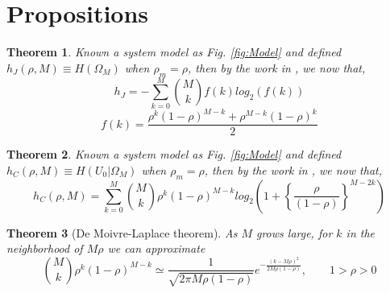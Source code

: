\documentclass[a4paper,10pt]{article}
\newtheorem{mytheorem}{Theorem}
\begin{document}
\section{Propositions}
\label{sec:Propositions}

\begin{mdframed}[style=MDFStyGrayScreen]
\begin{mytheorem}
 \label{prop:OmegaM}
 Known a system model as Fig. \ref{fig:Model} and defined $h_{J}(\rho,M)\equiv H(\Omega_M)$ 
 when $\rho_m=\rho$, then
 by the work in \cite[p.~37]{shomega}, we now that,
\begin{equation}\label{eq:OmegaMP1}
 h_{J} = -\sum_{k=0}^M \binom{M}{k}f(k)log_2( f(k) )
\end{equation}
\begin{equation}\label{eq:OmegaMP2}
f(k)=\frac{ \rho^k (1-\rho)^{M-k} + \rho^{M-k} (1-\rho)^k }{2}
\end{equation}
\end{mytheorem}
\end{mdframed}


\begin{mdframed}[style=MDFStyGrayScreen]
\begin{mytheorem}
 \label{prop:h0OmegaM}
 Known a system model as Fig. \ref{fig:Model} and defined $h_{C}(\rho,M)\equiv H(U_0|\Omega_M)$ 
 when $\rho_m=\rho$, then
 by the work in \cite[p.~37]{shu0omega}, we now that,
\begin{equation}\label{eq:h0OmegaMP}
h_{C}(\rho,M)  = \sum_{k=0}^M \binom{M}{k} \rho^k (1-\rho)^{M-k} log_2\left ( 1 + \left\{\frac{\rho}{(1-\rho)}\right\}^{M-2k} \right )    
\end{equation}
\end{mytheorem}
\end{mdframed}


\begin{mdframed}[style=MDFStyGrayScreen]
\begin{mytheorem}[De Moivre-Laplace theorem]
 \label{teo:MoivreLaplace}
As $M$ grows large, for $k$ in the neighborhood of $M\rho$ we can approximate
\begin{equation}\label{eq:MoivreLaplace}
 {M \choose k} \rho^{k}(1-\rho)^{M-k}\simeq \frac{1}{\sqrt{2\pi M\rho (1-\rho)}} e^{-\frac{(k-M\rho)^{2}}{2M\rho (1-\rho)}}, \qquad   1>\rho>0 
\end{equation}
\end{mytheorem}
\end{mdframed}
\end{document}
